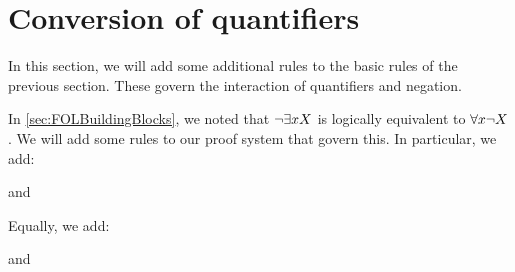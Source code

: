 \chapter{Conversion of quantifiers}\label{sec:CQ}

In this section, we will add some additional rules to the basic rules of the previous section. These govern the interaction of quantifiers and negation.

In \cref{sec:FOLBuildingBlocks}, we noted that $\neg\exists xX$ is logically equivalent to $\forall x \neg X$. We will add some rules to our proof system that govern this. In particular, we add:
	\begin{highlighted}
	\begin{fitchproof}
	\end{fitchproof}\end{highlighted}
and
\begin{highlighted}
	\begin{fitchproof}
		\have[m]{a}{ \enot \exists \meta{v} \metaX}
		\cq{a}
	\end{fitchproof}\end{highlighted}
Equally, we add:
\begin{highlighted}
	\begin{fitchproof}
		\have[m]{a}{\exists \meta{v}\enot \metaX}
		\cq{a}
	\end{fitchproof}\end{highlighted}
and
\begin{highlighted}
	\begin{fitchproof}
		\have[m]{a}{\enot \forall \meta{v} \metaX}
	\end{fitchproof}\end{highlighted}

